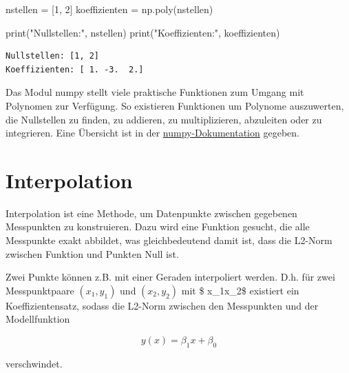 \documentclass[
  letterpaper,
  DIV=11,
  numbers=noendperiod]{scrreprt}
\newenvironment{Shaded}{\begin{snugshade}}{\end{snugshade}}
\newcommand{\BuiltInTok}[1]{\textcolor[rgb]{0.00,0.23,0.31}{#1}}
\newcommand{\DecValTok}[1]{\textcolor[rgb]{0.68,0.00,0.00}{#1}}
\newcommand{\NormalTok}[1]{\textcolor[rgb]{0.00,0.23,0.31}{#1}}
\newcommand{\OperatorTok}[1]{\textcolor[rgb]{0.37,0.37,0.37}{#1}}
\newcommand{\StringTok}[1]{\textcolor[rgb]{0.13,0.47,0.30}{#1}}
\begin{document}
\begin{Shaded}
\begin{Highlighting}[]
\NormalTok{nstellen }\OperatorTok{=}\NormalTok{ [}\DecValTok{1}\NormalTok{, }\DecValTok{2}\NormalTok{]}
\NormalTok{koeffizienten }\OperatorTok{=}\NormalTok{ np.poly(nstellen)}

\BuiltInTok{print}\NormalTok{(}\StringTok{"Nullstellen:"}\NormalTok{, nstellen)}
\BuiltInTok{print}\NormalTok{(}\StringTok{"Koeffizienten:"}\NormalTok{, koeffizienten)}
\end{Highlighting}
\end{Shaded}

\begin{verbatim}
Nullstellen: [1, 2]
Koeffizienten: [ 1. -3.  2.]
\end{verbatim}

Das Modul numpy stellt viele praktische Funktionen zum Umgang mit
Polynomen zur Verfügung. So existieren Funktionen um Polynome
auszuwerten, die Nullstellen zu finden, zu addieren, zu multiplizieren,
abzuleiten oder zu integrieren. Eine Übersicht ist in der
\href{https://numpy.org/doc/stable/reference/routines.polynomials.poly1d.html}{numpy-Dokumentation}
gegeben.

\section{Interpolation}\label{interpolation}

Interpolation ist eine Methode, um Datenpunkte zwischen gegebenen
Messpunkten zu konstruieren. Dazu wird eine Funktion gesucht, die alle
Messpunkte exakt abbildet, was gleichbedeutend damit ist, dass die
L2-Norm zwischen Funktion und Punkten Null ist.

Zwei Punkte können z.B. mit einer Geraden interpoliert werden. D.h. für
zwei Messpunktpaare \((x_1, y_1)\) und \((x_2, y_2)\) mit \$
x\_1\neq x\_2\$ existiert ein Koeffizientensatz, sodass die L2-Norm
zwischen den Messpunkten und der Modellfunktion

\[y(x) = \beta_1 x + \beta_0\]

verschwindet.
\end{document}
